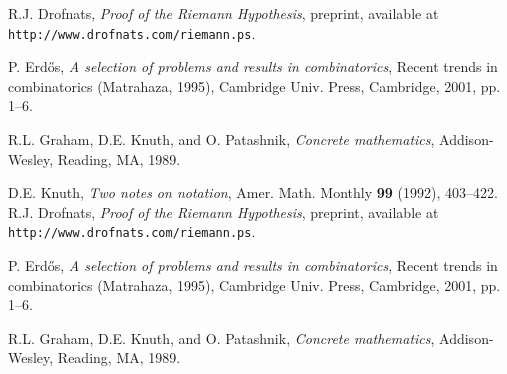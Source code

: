 \begin{thebibliography}{99}
 R.J. Drofnats, \emph{Proof of the Riemann
Hypothesis},  preprint, available at
\texttt{http://www.drofnats.com/riemann.ps}.

 P. Erd\H os, \emph{A selection of problems and
results in combinatorics}, Recent trends in combinatorics
(Matrahaza, 1995), Cambridge Univ. Press, Cambridge, 2001, pp. 1--6.

R.L. Graham, D.E. Knuth, and O. Patashnik, \emph{Concrete
mathematics}, Addison-Wesley, Reading, MA, 1989.

 D.E. Knuth, \emph{Two notes on notation}, Amer.
Math. Monthly \textbf{99} (1992), 403--422.
 R.J. Drofnats, \emph{Proof of the Riemann
Hypothesis},  preprint, available at
\texttt{http://www.drofnats.com/riemann.ps}.

 P. Erd\H os, \emph{A selection of problems and
results in combinatorics}, Recent trends in combinatorics
(Matrahaza, 1995), Cambridge Univ. Press, Cambridge, 2001, pp. 1--6.

R.L. Graham, D.E. Knuth, and O. Patashnik, \emph{Concrete
mathematics}, Addison-Wesley, Reading, MA, 1989.

\end{thebibliography}
